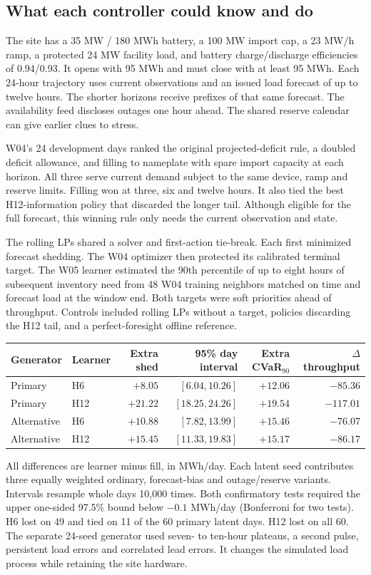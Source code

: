 \documentclass[10pt,letterpaper]{article}
\newcommand{\sub}[1]{\subsection*{\color{green}#1}}
\begin{document}
\sub{What each controller could know and do}
The site has a 35 MW / 180 MWh battery, a 100 MW import cap, a 23 MW/h ramp, a protected 24 MW facility load, and battery charge/discharge efficiencies of 0.94/0.93. It opens with 95 MWh and must close with at least 95 MWh. Each 24-hour trajectory uses current observations and an issued load forecast of up to twelve hours. The shorter horizons receive prefixes of that same forecast. The availability feed discloses outages one hour ahead. The shared reserve calendar can give earlier clues to stress.

W04's 24 development days ranked the original projected-deficit rule, a doubled deficit allowance, and filling to nameplate with spare import capacity at each horizon. All three serve current demand subject to the same device, ramp and reserve limits. Filling won at three, six and twelve hours. It also tied the best H12-information policy that discarded the longer tail. Although eligible for the full forecast, this winning rule only needs the current observation and state.

The rolling LPs shared a solver and first-action tie-break. Each first minimized forecast shedding. The W04 optimizer then protected its calibrated terminal target. The W05 learner estimated the 90th percentile of up to eight hours of subsequent inventory need from 48 W04 training neighbors matched on time and forecast load at the window end. Both targets were soft priorities ahead of throughput. Controls included rolling LPs without a target, policies discarding the H12 tail, and a perfect-foresight offline reference.

\begin{center}\small
\begin{tabular}{@{}llrrrr@{}}
\toprule
Generator & Learner & Extra shed & 95\% day interval & Extra CVaR$_{90}$ & $\Delta$ throughput\\\midrule
Primary & H6  & $+8.05$ & $[6.04,10.26]$   & $+12.06$ & $-85.36$\\
Primary & H12 & $+21.22$ & $[18.25,24.26]$ & $+19.54$ & $-117.01$\\
Alternative & H6 & $+10.88$ & $[7.82,13.99]$  & $+15.46$ & $-76.07$\\
Alternative & H12 & $+15.45$ & $[11.33,19.83]$ & $+15.17$ & $-86.17$\\\bottomrule
\end{tabular}
\end{center}
All differences are learner minus fill, in MWh/day. Each latent seed contributes three equally weighted ordinary, forecast-bias and outage/reserve variants. Intervals resample whole days 10,000 times. Both confirmatory tests required the upper one-sided 97.5\% bound below $-0.1$ MWh/day (Bonferroni for two tests). H6 lost on 49 and tied on 11 of the 60 primary latent days. H12 lost on all 60. The separate 24-seed generator used seven- to ten-hour plateaus, a second pulse, persistent load errors and correlated lead errors. It changes the simulated load process while retaining the site hardware.
\end{document}
